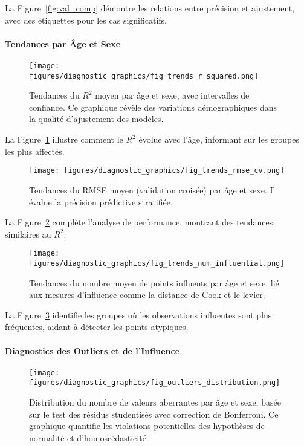 La Figure~\ref{fig:val_comp} démontre les relations entre précision et ajustement, avec des étiquettes pour les cas significatifs.

\paragraph{Tendances par Âge et Sexe}

\begin{figure}[H]
	\centering
	\texttt{[image: figures/diagnostic\_graphics/fig\_trends\_r\_squared.png]}
	\caption{Tendances du $R^2$ moyen par âge et sexe, avec intervalles de confiance. Ce graphique révèle des variations démographiques dans la qualité d'ajustement des modèles.}
	\label{fig:trends_r2}
\end{figure}

La Figure~\ref{fig:trends_r2} illustre comment le $R^2$ évolue avec l'âge, informant sur les groupes les plus affectés.

\begin{figure}[H]
	\centering
	\texttt{[image: figures/diagnostic\_graphics/fig\_trends\_rmse\_cv.png]}
	\caption{Tendances du RMSE moyen (validation croisée) par âge et sexe. Il évalue la précision prédictive stratifiée.}
	\label{fig:trends_rmse}
\end{figure}

La Figure~\ref{fig:trends_rmse} complète l'analyse de performance, montrant des tendances similaires au $R^2$.

\begin{figure}[H]
	\centering
	\texttt{[image: figures/diagnostic\_graphics/fig\_trends\_num\_influential.png]}
	\caption{Tendances du nombre moyen de points influents par âge et sexe, lié aux mesures d'influence comme la distance de Cook et le levier.}
	\label{fig:trends_infl}
\end{figure}

La Figure~\ref{fig:trends_infl} identifie les groupes où les observations influentes sont plus fréquentes, aidant à détecter les points atypiques.

\paragraph{Diagnostics des Outliers et de l'Influence}

\begin{figure}[H]
	\centering
	\texttt{[image: figures/diagnostic\_graphics/fig\_outliers\_distribution.png]}
	\caption{Distribution du nombre de valeurs aberrantes par âge et sexe, basée sur le test des résidus studentisés avec correction de Bonferroni. Ce graphique quantifie les violations potentielles des hypothèses de normalité et d'homoscédasticité.}
	\label{fig:outliers}
\end{figure}

